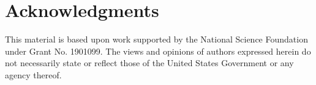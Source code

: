 \documentclass[letterpaper]{article} %
\begin{document}
 \section{Acknowledgments}
 This material is based upon work supported by the National Science Foundation under Grant No. 1901099. The views and opinions of authors expressed herein do not necessarily state or reflect those of the United States Government or any agency thereof. 
 

\fontsize{9pt}{10pt} \selectfont







\end{document}
